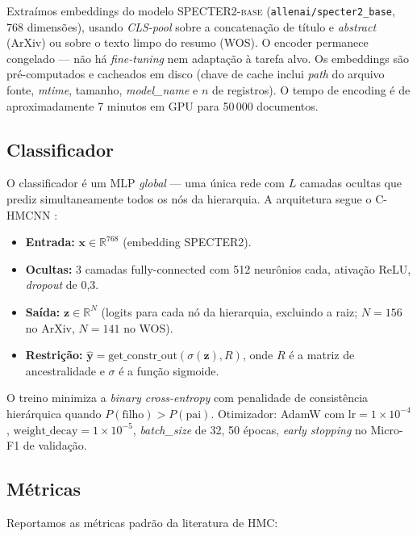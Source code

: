 \documentclass[11pt,a4paper,twoside]{article}
\begin{document}
Extraímos embeddings do modelo \textsc{SPECTER2-base}
\cite{cohan2020specter} (\texttt{allenai/specter2\_base}, 768 dimensões), usando
\textit{CLS-pool} sobre a concatenação de título e \textit{abstract} (ArXiv) ou
sobre o texto limpo do resumo (WOS). O encoder permanece congelado --- não há
\textit{fine-tuning} nem adaptação à tarefa alvo. Os embeddings são pré-computados
e cacheados em disco (chave de cache inclui \textit{path} do arquivo fonte,
\textit{mtime}, tamanho, \textit{model\_name} e $n$ de registros). O tempo de
encoding é de aproximadamente 7 minutos em GPU para 50\,000 documentos.

\subsection{Classificador}

O classificador é um MLP \textit{global} --- uma única rede com $L$ camadas ocultas
que prediz simultaneamente todos os nós da hierarquia. A arquitetura segue o
\textsc{C-HMCNN} \cite{giunchiglia2020coherent}:

\begin{itemize}[leftmargin=*, itemsep=2pt]
  \item \textbf{Entrada:} $\mathbf{x} \in \mathbb{R}^{768}$ (embedding SPECTER2).
  \item \textbf{Ocultas:} 3 camadas fully-connected com 512 neurônios cada,
        ativação ReLU, \textit{dropout} de 0,3.
  \item \textbf{Saída:} $\mathbf{z} \in \mathbb{R}^{N}$ (logits para cada nó da
        hierarquia, excluindo a raiz; $N=156$ no ArXiv, $N=141$ no WOS).
  \item \textbf{Restrição:} $\hat{\mathbf{y}} = \text{get\_constr\_out}(\sigma(\mathbf{z}), R)$,
        onde $R$ é a matriz de ancestralidade e $\sigma$ é a função sigmoide.
\end{itemize}

O treino minimiza a \textit{binary cross-entropy} com penalidade de consistência
hierárquica quando $P(\text{filho}) > P(\text{pai})$. Otimizador: AdamW com
$\text{lr} = 1\times10^{-4}$, $\text{weight\_decay} = 1\times10^{-5}$,
\textit{batch\_size} de 32, 50 épocas, \textit{early stopping} no Micro-F1
de validação.

\subsection{Métricas}

Reportamos as métricas padrão da literatura de HMC:
\end{document}
